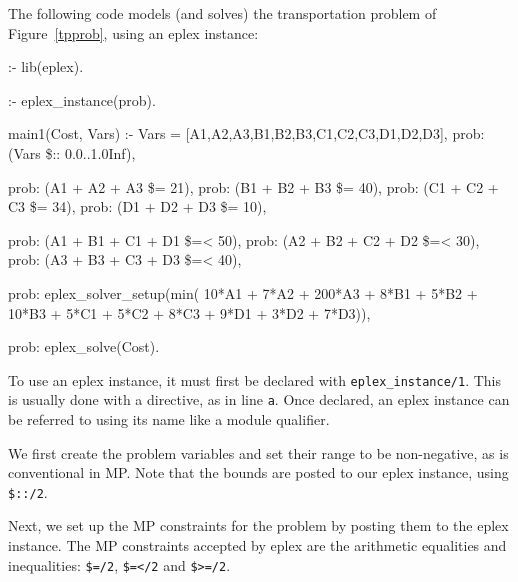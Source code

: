 The following code models (and solves) the transportation problem of
Figure~\ref{tpprob}, using an eplex instance:

{\small
\begin{code}
:- lib(eplex).

:- eplex_instance(prob).  %

main1(Cost, Vars) :-
        Vars = [A1,A2,A3,B1,B2,B3,C1,C2,C3,D1,D2,D3], 
        prob: (Vars \$:: 0.0..1.0Inf),

        prob: (A1 + A2 + A3 \$= 21),
        prob: (B1 + B2 + B3 \$= 40),
        prob: (C1 + C2 + C3 \$= 34),
        prob: (D1 + D2 + D3 \$= 10),

        prob: (A1 + B1 + C1 + D1 \$=< 50),
        prob: (A2 + B2 + C2 + D2 \$=< 30),
        prob: (A3 + B3 + C3 + D3 \$=< 40),

        prob: eplex_solver_setup(min(
                10*A1 + 7*A2 + 200*A3 + 
                 8*B1 + 5*B2 + 10*B3 +
                 5*C1 + 5*C2 +  8*C3 + 
                 9*D1 + 3*D2 +  7*D3)),


        prob: eplex_solve(Cost).  %

\end{code}
}

To use an eplex instance, it must first be declared with \verb'eplex_instance/1'. 
This is usually done with a directive, as in line \verb'a'.
Once
declared, an eplex instance can be referred to using its name like a module
qualifier.

We first create the problem
variables and set their range to be non-negative, as is conventional in MP.
Note that the bounds are posted to our eplex instance, using \verb'$::/2'.

Next, we set up the MP constraints for the
problem by posting them to the eplex instance. 
The MP constraints accepted by eplex are the arithmetic equalities and 
inequalities:
\verb'$=/2', \verb'$=</2' and \verb'$>=/2'.

